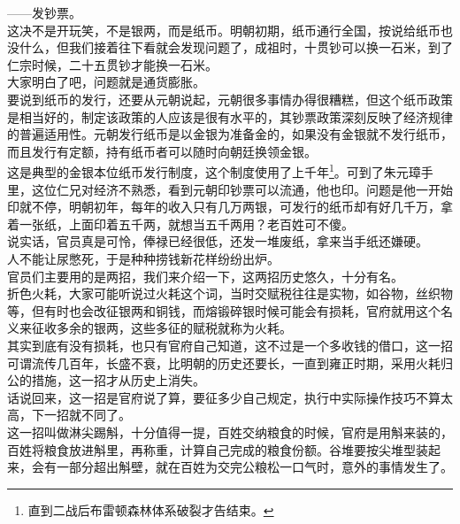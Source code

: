\begin{multicols}{\theparacolNo}
——发钞票。\\

这决不是开玩笑，不是银两，而是纸币。明朝初期，纸币通行全国，按说给纸币也没什么，但我们接着往下看就会发现问题了，成祖时，十贯钞可以换一石米，到了仁宗时候，二十五贯钞才能换一石米。\\

大家明白了吧，问题就是通货膨胀。\\

要说到纸币的发行，还要从元朝说起，元朝很多事情办得很糟糕，但这个纸币政策是相当好的，制定该政策的人应该是很有水平的，其钞票政策深刻反映了经济规律的普遍适用性。元朝发行纸币是以金银为准备金的，如果没有金银就不发行纸币，而且发行有定额，持有纸币者可以随时向朝廷换领金银。\\

这是典型的金银本位纸币发行制度，这个制度使用了上千年\footnote{直到二战后布雷顿森林体系破裂才告结束。}。可到了朱元璋手里，这位仁兄对经济不熟悉，看到元朝印钞票可以流通，他也印。问题是他一开始印就不停，明朝初年，每年的收入只有几万两银，可发行的纸币却有好几千万，拿着一张纸，上面印着五千两，就想当五千两用？老百姓可不傻。\\

说实话，官员真是可怜，俸禄已经很低，还发一堆废纸，拿来当手纸还嫌硬。\\

人不能让尿憋死，于是种种捞钱新花样纷纷出炉。\\

官员们主要用的是两招，我们来介绍一下，这两招历史悠久，十分有名。\\

折色火耗，大家可能听说过火耗这个词，当时交赋税往往是实物，如谷物，丝织物等，但有时也会改征银两和铜钱，而熔锻碎银时候可能会有损耗，官府就用这个名义来征收多余的银两，这些多征的赋税就称为火耗。\\

其实到底有没有损耗，也只有官府自己知道，这不过是一个多收钱的借口，这一招可谓流传几百年，长盛不衰，比明朝的历史还要长，一直到雍正时期，采用火耗归公的措施，这一招才从历史上消失。\\

话说回来，这一招是官府说了算，要征多少自己规定，执行中实际操作技巧不算太高，下一招就不同了。\\

这一招叫做淋尖踢斛，十分值得一提，百姓交纳粮食的时候，官府是用斛来装的，百姓将粮食放进斛里，再称重，计算自己完成的粮食份额。谷堆要按尖堆型装起来，会有一部分超出斛壁，就在百姓为交完公粮松一口气时，意外的事情发生了。\\


\end{multicols}
